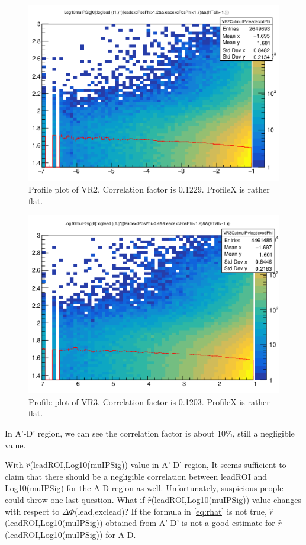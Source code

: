 \begin{figure}[h!]
  \caption{Profile plot of VR2. Correlation factor is 0.1229. ProfileX is rather flat.}
  \label{fig:valcar2}
  \centering
  \includegraphics[width=0.65\linewidth]{figs/VR2.png}

\end{figure}

\begin{figure}[h!]
  \caption{Profile plot of VR3. Correlation factor is 0.1203. ProfileX is rather flat.}
  \label{fig:valcar3}
  \centering
  \includegraphics[width=0.65\linewidth]{figs/VR3.png}

\end{figure}
In A'-D' region, we can see the correlation factor is about 10\%, still a negligible value.


With $\hat{r}$(leadROI,Log10(muIPSig)) value in A'-D' region, It seems sufficient to claim that there should be a negligible correlation between leadROI and Log10(muIPSig) for the A-D region as well.
Unfortunately, suspicious people could throw one last question.
What if $\hat{r}$(leadROI,Log10(muIPSig)) value changes with respect to $\Delta\Phi$(lead,exclead)?
If the formula in \ref{eq:rhat} is not true, \newline $\hat{r}$(leadROI,Log10(muIPSig)) obtained from A'-D' is not a good estimate for $\hat{r}$(leadROI,Log10(muIPSig)) for A-D.


